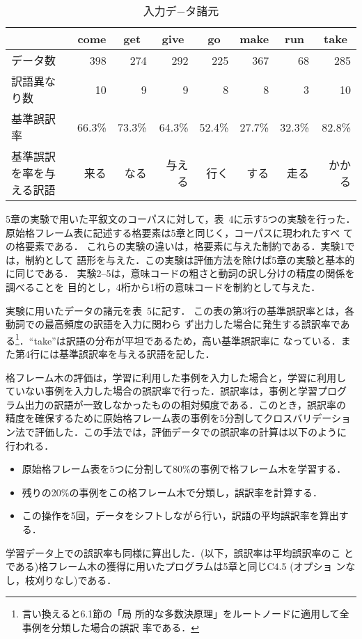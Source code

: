 \begin{table}
  \begin{center}
    \caption{入力デ−タ諸元}
    \begin{tabular}{l|rrrrrrr}\hline\hline
      & \multicolumn{1}{c}{come}& \multicolumn{1}{c}{get}&
      \multicolumn{1}{c}{give}& \multicolumn{1}{c}{go}&
      \multicolumn{1}{c}{make}& \multicolumn{1}{c}{run}&
      \multicolumn{1}{c}{take}\\\hline
      データ数& 398& 274& 292& 225& 367& 68& 285\\
      訳語異なり数& 10& 9& 9& 8& 8& 3& 10\\
      基準誤訳率& 66.3\%& 73.3\%& 64.3\%& 52.4\%& 27.7\%& 32.3\%& 82.8\%\\
      基準誤訳を率を与える訳語& 来る& なる& 与える& 行く& する& 走る& かかる\\
      \hline
    \end{tabular}
  \end{center}
\end{table}
5章の実験で用いた平叙文のコーパスに対して，表~4に示す5つの実験を行った．
原始格フレーム表に記述する格要素は5章と同じく，コーパスに現われたすべ
ての格要素である．
これらの実験の違いは，格要素に与えた制約である．実験1では，制約として
語形を与えた．この実験は評価方法を除けば5章の実験と基本的に同じである．
実験2--5は，意味コードの粗さと動詞の訳し分けの精度の関係を調べることを
目的とし，4桁から1桁の意味コードを制約として与えた．

実験に用いたデータの諸元を表~5に記す．
この表の第3行の基準誤訳率とは，各動詞での最高頻度の訳語を入力に関わら
ず出力した場合に発生する誤訳率である\footnote{言い換えると6.1節の「局
  所的な多数決原理」をルートノードに適用して全事例を分類した場合の誤訳
  率である．}．``take''は訳語の分布が平坦であるため，高い基準誤訳率に
なっている．また第4行には基準誤訳率を与える訳語を記した．

格フレーム木の評価は，学習に利用した事例を入力した場合と，学習に利用し
ていない事例を入力した場合の誤訳率で行った．誤訳率は，事例と学習プログ
ラム出力の訳語が一致しなかったものの相対頻度である．このとき，誤訳率の
精度を確保するために原始格フレーム表の事例を5分割してクロスバリデーショ
ン法で評価した．この手法では，評価データでの誤訳率の計算は以下のように
行われる．
\begin{itemize}
\item 原始格フレーム表を5つに分割して80\%の事例で格フレーム木を学習する．
\item 残りの20\%の事例をこの格フレーム木で分類し，誤訳率を計算する．
\item この操作を5回，データをシフトしながら行い，訳語の平均誤訳率を算出する．
\end{itemize}
学習データ上での誤訳率も同様に算出した．(以下，誤訳率は平均誤訳率のこ
とである)格フレーム木の獲得に用いたプログラムは5章と同じC4.5 (オプショ
ンなし，枝刈りなし)である．


